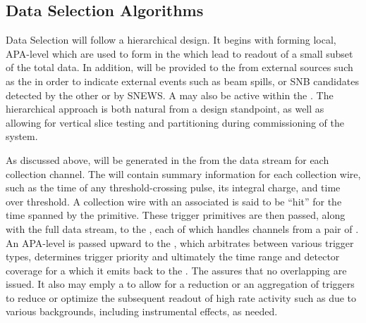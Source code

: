 

\subsection{Data Selection Algorithms}
\label{sec:fd-daq-sel}




Data Selection will follow a hierarchical design. 
It begins with forming local, APA-level  which
are used to form   in the
 which lead to readout of a small subset of the total data. 
In addition,  will be provided to the
 from external sources such as the  in order to
indicate external events such as beam spills, or SNB candidates
detected by the other  or by SNEWS.
A  may also be active within the . 
The hierarchical approach is both natural from a design standpoint, as
well as allowing for vertical slice testing and partitioning during
commissioning of the system.

As discussed above,  will be generated in the
 from the data stream for each collection channel. 
The  will contain summary information for each
collection wire, such as the time of any threshold-crossing pulse, its
integral charge, and time over threshold. 
A collection wire with an associated  is said to
be ``hit'' for the time spanned by the primitive. 
These trigger primitives are then passed, along with the full data
stream, to the , each of which handles channels from a pair
of . 
An APA-level  is passed upward to the
, which arbitrates between various trigger types,
determines trigger priority and ultimately the time range and detector
coverage for a  which it emits back to the
.
The  assures that no overlapping  are
issued.
It also may emply a  to allow for a reduction or an
aggregation of triggers to reduce or optimize the subsequent readout
of high rate activity such as due to various backgrounds, including
instrumental effects, as needed.

